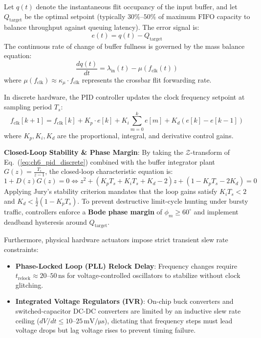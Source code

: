 Let $q(t)$ denote the instantaneous flit occupancy of the input buffer, and let $Q_{\mathrm{target}}$ be the optimal setpoint (typically $30\%\text{--}50\%$ of maximum FIFO capacity to balance throughput against queuing latency). The error signal is:
\begin{equation}
e(t) = q(t) - Q_{\mathrm{target}}
\label{eq:ch6_error}
\end{equation}
The continuous rate of change of buffer fullness is governed by the mass balance equation:
\begin{equation}
\frac{d q(t)}{dt} = \lambda_{\mathrm{in}}(t) - \mu(f_{\mathrm{clk}}(t))
\label{eq:ch6_buffer_derivative}
\end{equation}
where $\mu(f_{\mathrm{clk}}) \approx \kappa_{\mu} \cdot f_{\mathrm{clk}}$ represents the crossbar flit forwarding rate.

In discrete hardware, the PID controller updates the clock frequency setpoint at sampling period $T_s$:
\begin{equation}
f_{\mathrm{clk}}[k+1] = f_{\mathrm{clk}}[k] + K_p \cdot e[k] + K_i \sum_{m=0}^k e[m] + K_d (e[k] - e[k-1])
\label{eq:ch6_pid_discrete}
\end{equation}
where $K_p, K_i, K_d$ are the proportional, integral, and derivative control gains.

\begin{svgraybox}
\textbf{Closed-Loop Stability \& Phase Margin}: By taking the $\mathcal{Z}$-transform of Eq.~(\ref{eq:ch6_pid_discrete}) combined with the buffer integrator plant $G(z) = \frac{T_s}{z - 1}$, the closed-loop characteristic equation is:
\begin{equation}
1 + D(z) G(z) = 0 \iff z^2 + \left( K_p T_s + K_i T_s + K_d - 2 \right) z + \left( 1 - K_p T_s - 2 K_d \right) = 0
\end{equation}
Applying Jury's stability criterion mandates that the loop gains satisfy $K_i T_s < 2$ and $K_d < \frac{1}{2} (1 - K_p T_s)$. To prevent destructive limit-cycle hunting under bursty traffic, controllers enforce a \textbf{Bode phase margin} of $\phi_m \ge 60^\circ$ and implement deadband hysteresis around $Q_{\mathrm{target}}$.
\end{svgraybox}

Furthermore, physical hardware actuators impose strict transient slew rate constraints:
\begin{itemize}
    \item \textbf{Phase-Locked Loop (PLL) Relock Delay}: Frequency changes require $t_{\mathrm{relock}} \approx 20\text{--}50\,\mathrm{ns}$ for voltage-controlled oscillators to stabilize without clock glitching.
    \item \textbf{Integrated Voltage Regulators (IVR)}: On-chip buck converters and switched-capacitor DC-DC converters are limited by an inductive slew rate ceiling ($dV/dt \le 10\text{--}25\,\mathrm{mV/\mu s}$), dictating that frequency steps must lead voltage drops but lag voltage rises to prevent timing failure.
\end{itemize}

